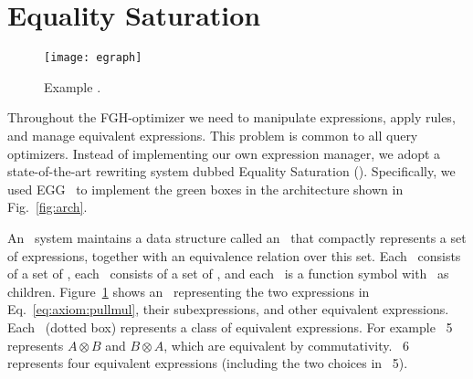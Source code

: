 %



\section{Equality Saturation}
\label{sec:semantic-opt}


\begin{figure}
  \texttt{[image: egraph]}
  \caption{Example \egraph.}\label{fig:eqsat}
\end{figure}

Throughout the FGH-optimizer we need to manipulate expressions, apply
rules, and manage equivalent expressions.  This problem is common to
all query optimizers.  Instead of implementing our own expression
manager, we adopt a state-of-the-art rewriting system dubbed
Equality Saturation (\eqsat).
Specifically, we used
EGG~\cite{DBLP:journals/pacmpl/WillseyNWFTP21} to implement the green
boxes in the architecture shown in Fig.~\ref{fig:arch}.

An \eqsat\ system maintains a data structure called an
\egraph\ that compactly represents a set of expressions, together with
an equivalence relation over this set.  Each \egraph\ consists of a set
of \eclasses, each \eclass\ consists of a set of \enodes, and each
\enode\ is a function symbol with \eclasses\ as children.
Figure~\ref{fig:eqsat} shows an \egraph\ representing the two
expressions in Eq.~\eqref{eq:axiom:pullmul}, their subexpressions, and
other equivalent expressions.  Each \eclass\ (dotted box) represents a class of
equivalent expressions.  For example \eclass\ 5 represents
$A \otimes B$ and $B \otimes A$, which are equivalent by
commutativity.  \eclass\ 6 represents four equivalent expressions
(including the two choices in \eclass\ 5).

